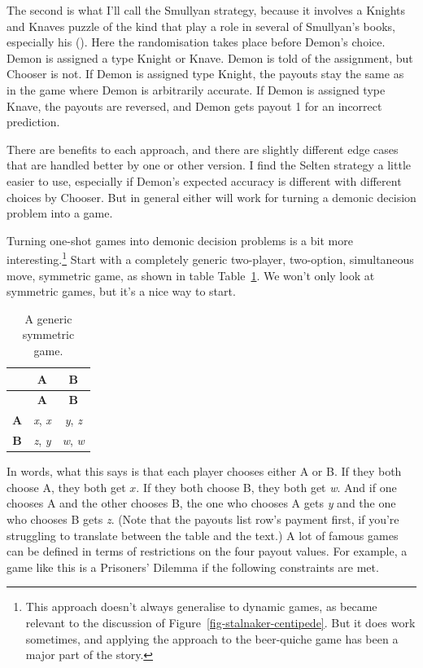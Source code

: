\documentclass[
  12pt,
  letterpaper,
  DIV=11,
  numbers=noendperiod]{scrreprt}
\begin{document}
The second is what I'll call the Smullyan strategy, because it involves
a Knights and Knaves puzzle of the kind that play a role in several of
Smullyan's books, especially his ().
Here the randomisation takes place before Demon's choice. Demon is
assigned a type Knight or Knave. Demon is told of the assignment, but
Chooser is not. If Demon is assigned type Knight, the payouts stay the
same as in the game where Demon is arbitrarily accurate. If Demon is
assigned type Knave, the payouts are reversed, and Demon gets payout 1
for an incorrect prediction.

There are benefits to each approach, and there are slightly different
edge cases that are handled better by one or other version. I find the
Selten strategy a little easier to use, especially if Demon's expected
accuracy is different with different choices by Chooser. But in general
either will work for turning a demonic decision problem into a game.

Turning one-shot games into demonic decision problems is a bit more
interesting.\footnote{This approach doesn't always generalise to dynamic
  games, as became relevant to the discussion of
  Figure~\ref{fig-stalnaker-centipede}. But it does work sometimes, and
  applying the approach to the beer-quiche game has been a major part of
  the story.} Start with a completely generic two-player, two-option,
simultaneous move, symmetric game, as shown in table
Table~\ref{tbl-basic-sym-game}. We won't only look at symmetric games,
but it's a nice way to start.

\begin{longtable}[]{@{}ccc@{}}
\caption{A generic symmetric
game.}\label{tbl-basic-sym-game}\tabularnewline
\toprule\noalign{}
& \textbf{A} & \textbf{B} \\
\midrule\noalign{}
\endfirsthead
\toprule\noalign{}
& \textbf{A} & \textbf{B} \\
\midrule\noalign{}
\endhead
\bottomrule\noalign{}
\endlastfoot
\textbf{A} & \emph{x}, \emph{x} & \emph{y}, \emph{z} \\
\textbf{B} & \emph{z}, \emph{y} & \emph{w}, \emph{w} \\
\end{longtable}

In words, what this says is that each player chooses either A or B. If
they both choose A, they both get \(x\). If they both choose B, they
both get \emph{w}. And if one chooses A and the other chooses B, the one
who chooses A gets \emph{y} and the one who chooses B gets \emph{z}.
(Note that the payouts list row's payment first, if you're struggling to
translate between the table and the text.) A lot of famous games can be
defined in terms of restrictions on the four payout values. For example,
a game like this is a Prisoners' Dilemma if the following constraints
are met.
\end{document}
